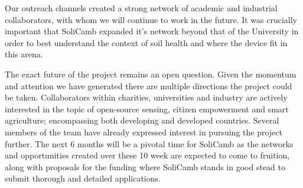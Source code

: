 Our outreach channels created a strong network of academic and industrial collaborators, with whom we will continue to work in the future. It was crucially important that SoliCamb expanded it's network beyond that of the University in order to best understand the context of soil health and where the device fit in this arena. 

The exact future of the project remains an open question. Given the momentum and attention we have generated there are multiple directions the project could be taken. Collaborators within charities, universities and industry are actively interested in the topic of open-source sensing, citizen empowerment and smart agriculture; encompassing both developing and developed countries. Several members of the team have already expressed interest in pursuing the project further. The next 6 months will be a pivotal time for SoliCamb as the networks and opportunities created over these 10 week are expected to come to fruition, along with proposals for the funding where SoliCamb stands in good stead to submit thorough and detailed applications. 
